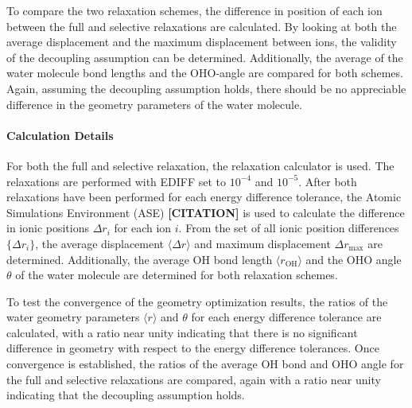         To compare the two relaxation schemes, the difference in position of each ion between the full and selective relaxations are calculated. By looking at both the average displacement and the maximum displacement between ions, the validity of the decoupling assumption can be determined. Additionally, the average of the water molecule bond lengths and the OHO-angle are compared for both schemes. Again, assuming the decoupling assumption holds, there should be no appreciable difference in the geometry parameters of the water molecule.
            
        \paragraph{Calculation Details} For both the full and selective relaxation, the relaxation calculator is used. The relaxations are performed with EDIFF set to $10^{-4}$ and $10^{-5}$. After both relaxations have been performed for each energy difference tolerance, the Atomic Simulations Environment (ASE) \textbf{[CITATION]} is used to calculate the difference in ionic positions $\Delta r_i$ for each ion $i$. From the set of all ionic position differences $\{\Delta r_i \}$, the average displacement $\langle \Delta r \rangle$ and maximum displacement $\Delta r_\text{max}$ are determined. Additionally, the average OH bond length $\langle r_\text{OH} \rangle$ and the OHO angle $\theta$ of the water molecule are determined for both relaxation schemes.
            
        To test the convergence of the geometry optimization results, the ratios of the water geometry parameters $\langle r \rangle$ and $\theta$ for each energy difference tolerance are calculated, with a ratio near unity indicating that there is no significant difference in geometry with respect to the energy difference tolerances. Once convergence is established, the ratios of the average OH bond and OHO angle for the full and selective relaxations are compared, again with a ratio near unity indicating that the decoupling assumption holds.
        
        
        
